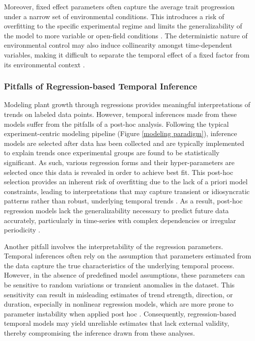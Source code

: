 \documentclass{article}
\begin{document}
Moreover, fixed effect parameters often capture the average trait progression under a narrow set of environmental conditions. 
This introduces a risk of overfitting to the specific experimental regime and limits the generalizability of the model to more variable or open-field conditions \cite{hawinkel2022spatial}. 
The deterministic nature of environmental control may also induce collinearity amongst time-dependent variables, making it difficult to separate the temporal effect of a fixed factor from its environmental context \cite{dormann2013collinearity}.

\subsubsection{Pitfalls of Regression-based Temporal Inference}
\label{pitfalls of regression}
Modeling plant growth through regressions provides meaningful interpretations of trends on labeled data points. 
However, temporal inferences made from these models suffer from the pitfalls of a post-hoc analysis. 
Following the typical experiment-centric modeling pipeline (Figure \ref{modeling paradigm}), inference models are selected after data has been collected and are typically implemented to explain trends once experimental groups are found to be statistically significant. 
As such, various regression forms and their hyper-parameters are selected once this data is revealed in order to achieve best fit. 
This post-hoc selection provides an inherent risk of overfitting due to the lack of a priori model constraints, leading to interpretations that may capture transient or idiosyncratic patterns rather than robust, underlying temporal trends \cite{babyak2004you,prakash2023temporal}. 
As a result, post-hoc regression models lack the generalizability necessary to predict future data accurately, particularly in time-series with complex dependencies or irregular periodicity \cite{hong2018overfitting,fithian2014optimal}.

Another pitfall involves the interpretability of the regression parameters. Temporal inferences often rely on the assumption that parameters estimated from the data capture the true characteristics of the underlying temporal process. However, in the absence of predefined model assumptions, these parameters can be sensitive to random variations or transient anomalies in the dataset. This sensitivity can result in misleading estimates of trend strength, direction, or duration, especially in nonlinear regression models, which are more prone to parameter instability when applied post hoc \cite{gutenkunst2007universally}. Consequently, regression-based temporal models may yield unreliable estimates that lack external validity, thereby compromising the inference drawn from these analyses.
\end{document}
